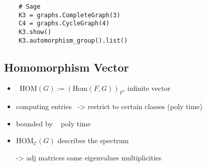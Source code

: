 \begin{verbatim}
    # Sage
    K3 = graphs.CompleteGraph(3)
    C4 = graphs.CycleGraph(4)
    K3.show()
    K3.automorphism_group().list()
\end{verbatim}

\subsection{Homomorphism Vector}
\begin{itemize}
    \item \homv\ $\text{HOM}(G):=(\text{Hom}(F,G))_F$, infinite vector
    \item computing entries \NPc\ -> restrict to certain classes (poly time)
    \item bounded by \tw\ <-> poly time 
    \item $\text{HOM}_{\mathcal{C}}(G)$ describes the spectrum
    \item[->] adj matrices same eigenvalues multiplicities
\end{itemize}

